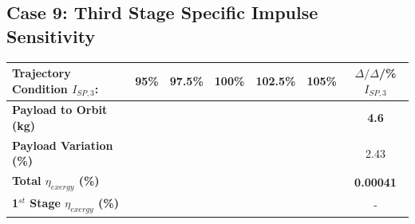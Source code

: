 \subsection{Case 9: Third Stage Specific Impulse Sensitivity}\label{sec:isp3NoReturn}

\begin{table}[ht]
	\centering
	\begin{tabular}{l c c c c c c} 
		\hline \textbf{Trajectory Condition}   \qquad  $I_{SP,3}$:
		&95\%
		&97.5\%
		&100\%
		&102.5\%
		&105\%
		& $\Delta/\Delta$/\%$I_{SP,3}$
		\\
		\hline \textbf{Payload to Orbit (kg)}
		& \textbf{\PayloadToOrbitTThreeNinetyNoReturn}
		& \textbf{\PayloadToOrbitTThreeNinetyFiveNoReturn}
		& \textbf{\PayloadToOrbitTThreeStandardNoReturn}
		& \textbf{\PayloadToOrbitTThreeOneHundredFiveNoReturn}
		& \textbf{\PayloadToOrbitTThreeOneHundredTenNoReturn}
		&\textbf{4.6}
		\\
		\textbf{Payload Variation (\%)}
		& \PayloadVarTThreeNinetyNoReturn
		& \PayloadVarTThreeNinetyFiveNoReturn
		& \PayloadVarTThreeStandardNoReturn
		& \PayloadVarTThreeOneHundredFiveNoReturn
		& \PayloadVarTThreeOneHundredTenNoReturn
		&2.43
		\\
		\textbf{Total $\eta_{exergy}$ (\%)}
		& \textbf{\totalExergyEffTThreeNinetyNoReturn}
		& \textbf{\totalExergyEffTThreeNinetyFiveNoReturn}
		& \textbf{\totalExergyEffTThreeStandardNoReturn}
		& \textbf{\totalExergyEffTThreeOneHundredFiveNoReturn}
		& \textbf{\totalExergyEffTThreeOneHundredTenNoReturn}
		& \textbf{0.00041}
		\\
		\hline 
		\textbf{1$^{st}$ Stage $\eta_{exergy}$ (\%)}
		& \textbf{\firstExergyEffTThreeNinetyNoReturn}
		& \textbf{\firstExergyEffTThreeNinetyFiveNoReturn}
		& \textbf{\firstExergyEffTThreeStandardNoReturn}
		& \textbf{\firstExergyEffTThreeOneHundredFiveNoReturn}
		& \textbf{\firstExergyEffTThreeOneHundredTenNoReturn}
		& -
		\\
	

\end{tabular}
\end{table}

